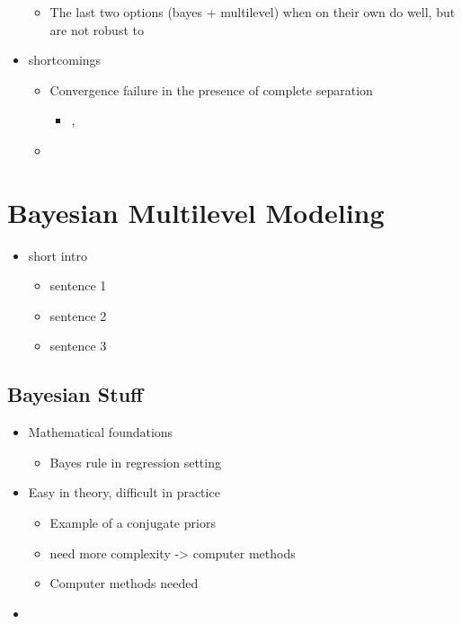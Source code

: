 \documentclass[
]{report}
\providecommand{\tightlist}{%
  \setlength{\itemsep}{0pt}\setlength{\parskip}{0pt}}
\begin{document}
\begin{itemize}
  \begin{itemize}
  \tightlist
  \item
    The last two options (bayes + multilevel) when on their own do well, but are not robust to
  \end{itemize}
\item
  shortcomings

  \begin{itemize}
  \item
    Convergence failure in the presence of complete separation

    \begin{itemize}
    \tightlist
    \item
      \citep{prins2019too}, \citep{ghosh2018use}
    \end{itemize}
  \item
  \end{itemize}
\end{itemize}

\hypertarget{bayesian-modeling}{%
\chapter{Bayesian Multilevel Modeling}\label{bayesian-modeling}}

\begin{itemize}
\tightlist
\item
  short intro

  \begin{itemize}
  \tightlist
  \item
    sentence 1
  \item
    sentence 2
  \item
    sentence 3
  \end{itemize}
\end{itemize}

\hypertarget{bayesian-stuff}{%
\section{Bayesian Stuff}\label{bayesian-stuff}}

\begin{itemize}
\item
  Mathematical foundations

  \begin{itemize}
  \tightlist
  \item
    Bayes rule in regression setting
  \end{itemize}
\item
  Easy in theory, difficult in practice

  \begin{itemize}
  \tightlist
  \item
    Example of a conjugate priors
  \item
    need more complexity -\textgreater{} computer methods
  \item
    Computer methods needed
  \end{itemize}
\item
\end{itemize}
\end{document}
